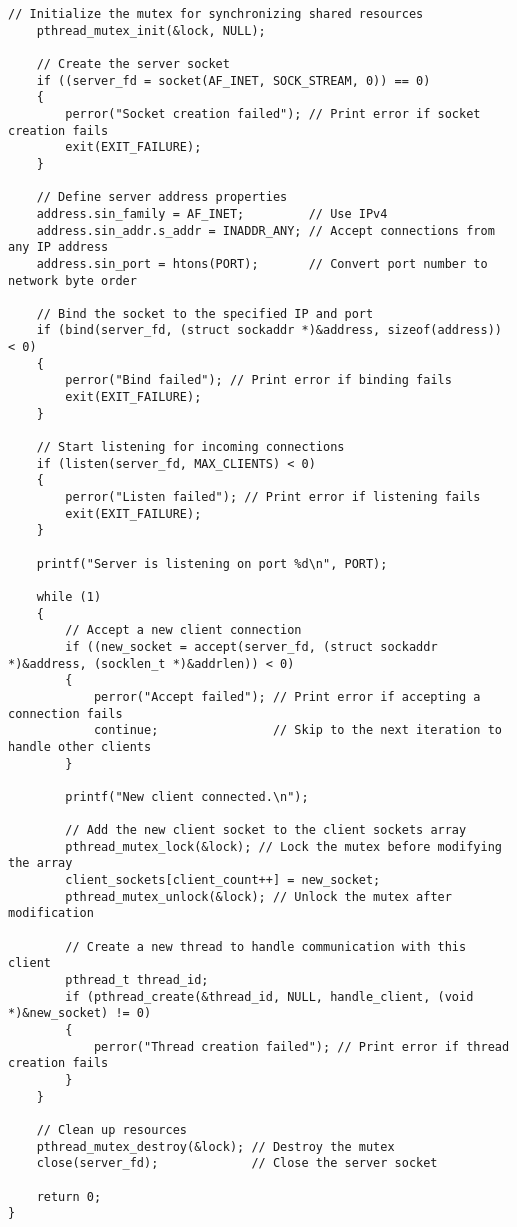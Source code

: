 \documentclass[a4paper,12pt]{article}
\begin{document}
\begin{lstlisting}[caption={Local System Server Code}, label={lst:local-server}]
    // Initialize the mutex for synchronizing shared resources
    pthread_mutex_init(&lock, NULL);

    // Create the server socket
    if ((server_fd = socket(AF_INET, SOCK_STREAM, 0)) == 0)
    {
        perror("Socket creation failed"); // Print error if socket creation fails
        exit(EXIT_FAILURE);
    }

    // Define server address properties
    address.sin_family = AF_INET;         // Use IPv4
    address.sin_addr.s_addr = INADDR_ANY; // Accept connections from any IP address
    address.sin_port = htons(PORT);       // Convert port number to network byte order

    // Bind the socket to the specified IP and port
    if (bind(server_fd, (struct sockaddr *)&address, sizeof(address)) < 0)
    {
        perror("Bind failed"); // Print error if binding fails
        exit(EXIT_FAILURE);
    }

    // Start listening for incoming connections
    if (listen(server_fd, MAX_CLIENTS) < 0)
    {
        perror("Listen failed"); // Print error if listening fails
        exit(EXIT_FAILURE);
    }

    printf("Server is listening on port %d\n", PORT);

    while (1)
    {
        // Accept a new client connection
        if ((new_socket = accept(server_fd, (struct sockaddr *)&address, (socklen_t *)&addrlen)) < 0)
        {
            perror("Accept failed"); // Print error if accepting a connection fails
            continue;                // Skip to the next iteration to handle other clients
        }

        printf("New client connected.\n");

        // Add the new client socket to the client sockets array
        pthread_mutex_lock(&lock); // Lock the mutex before modifying the array
        client_sockets[client_count++] = new_socket;
        pthread_mutex_unlock(&lock); // Unlock the mutex after modification

        // Create a new thread to handle communication with this client
        pthread_t thread_id;
        if (pthread_create(&thread_id, NULL, handle_client, (void *)&new_socket) != 0)
        {
            perror("Thread creation failed"); // Print error if thread creation fails
        }
    }

    // Clean up resources
    pthread_mutex_destroy(&lock); // Destroy the mutex
    close(server_fd);             // Close the server socket

    return 0;
}

\end{lstlisting}
\end{document}
